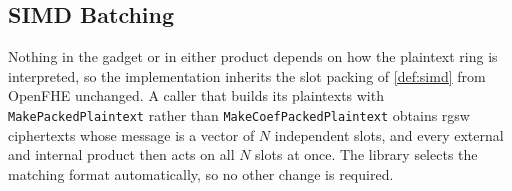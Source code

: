 \newpage
\newpage
\newpage

\subsection{SIMD Batching}
Nothing in the gadget or in either product depends on how the plaintext ring is interpreted, so the implementation inherits the slot packing of \autoref{def:simd} from OpenFHE unchanged. A caller that builds its plaintexts with \texttt{MakePackedPlaintext} rather than \texttt{MakeCoefPackedPlaintext} obtains \gls{rgsw} ciphertexts whose message is a vector of $N$ independent slots, and every external and internal product then acts on all $N$ slots at once. The library selects the matching format automatically, so no other change is required.